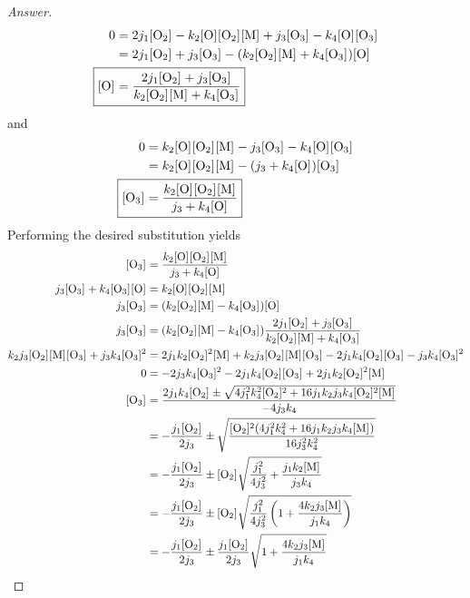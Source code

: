 \documentclass[../psets.tex]{subfiles}
\begin{document}
\begin{enumerate}[label={\textbf{29-\arabic*.}},leftmargin=3.5em]
\begin{proof}[Answer]
        \begin{align*}
            0 &= 2j_1\cnc{O2}-k_2\cnc{O}\cnc{O2}\cnc{M}+j_3\cnc{O3}-k_4\cnc{O}\cnc{O3}\\
            &= 2j_1\cnc{O2}+j_3\cnc{O3}-(k_2\cnc{O2}\cnc{M}+k_4\cnc{O3})\cnc{O}\\
            \Aboxed{\cnc{O} &= \frac{2j_1\cnc{O2}+j_3\cnc{O3}}{k_2\cnc{O2}\cnc{M}+k_4\cnc{O3}}}
        \end{align*}
        and
        \begin{align*}
            0 &= k_2\cnc{O}\cnc{O2}\cnc{M}-j_3\cnc{O3}-k_4\cnc{O}\cnc{O3}\\
            &= k_2\cnc{O}\cnc{O2}\cnc{M}-(j_3+k_4\cnc{O})\cnc{O3}\\
            \Aboxed{\cnc{O3} &= \frac{k_2\cnc{O}\cnc{O2}\cnc{M}}{j_3+k_4\cnc{O}}}
        \end{align*}
        Performing the desired substitution yields
        \begingroup
        \allowdisplaybreaks
        \begin{align*}
            \cnc{O3} &= \frac{k_2\cnc{O}\cnc{O2}\cnc{M}}{j_3+k_4\cnc{O}}\\
            j_3\cnc{O3}+k_4\cnc{O3}\cnc{O} &= k_2\cnc{O}\cnc{O2}\cnc{M}\\
            j_3\cnc{O3} &= (k_2\cnc{O2}\cnc{M}-k_4\cnc{O3})\cnc{O}\\
            j_3\cnc{O3} &= (k_2\cnc{O2}\cnc{M}-k_4\cnc{O3})\frac{2j_1\cnc{O2}+j_3\cnc{O3}}{k_2\cnc{O2}\cnc{M}+k_4\cnc{O3}}\\
            k_2j_3\cnc{O2}\cnc{M}\cnc{O3}+j_3k_4\cnc{O3}^2 &= 2j_1k_2\cnc{O2}^2\cnc{M}+k_2j_3\cnc{O2}\cnc{M}\cnc{O3}-2j_1k_4\cnc{O2}\cnc{O3}-j_3k_4\cnc{O3}^2\\
            0 &= -2j_3k_4\cnc{O3}^2-2j_1k_4\cnc{O2}\cnc{O3}+2j_1k_2\cnc{O2}^2\cnc{M}\\
            \cnc{O3} &= \frac{2j_1k_4\cnc{O2}\pm\sqrt{4j_1^2k_4^2\cnc{O2}^2+16j_1k_2j_3k_4\cnc{O2}^2\cnc{M}}}{-4j_3k_4}\\
            &= -\frac{j_1\cnc{O2}}{2j_3}\pm\sqrt{\frac{\cnc{O2}^2(4j_1^2k_4^2+16j_1k_2j_3k_4\cnc{M})}{16j_3^2k_4^2}}\\
            &= -\frac{j_1\cnc{O2}}{2j_3}\pm\cnc{O2}\sqrt{\frac{j_1^2}{4j_3^2}+\frac{j_1k_2\cnc{M}}{j_3k_4}}\\
            &= -\frac{j_1\cnc{O2}}{2j_3}\pm\cnc{O2}\sqrt{\frac{j_1^2}{4j_3^2}\left( 1+\frac{4k_2j_3\cnc{M}}{j_1k_4} \right)}\\
            &= -\frac{j_1\cnc{O2}}{2j_3}\pm\frac{j_1\cnc{O2}}{2j_3}\sqrt{1+\frac{4k_2j_3\cnc{M}}{j_1k_4}}\\

\end{align*}
\end{proof}
\end{enumerate}
\end{document}
